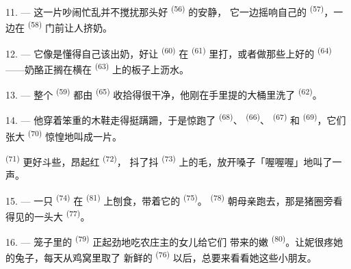 11. --- 这一片吵闹忙乱并不搅扰那头好 \textsuperscript{(56)} 的安静，
它一边摇响自己的 \textsuperscript{(57)}，一边在
\textsuperscript{(58)} 门前让人挤奶。

12. --- 它像是懂得自己该出奶，好让 \textsuperscript{(60)} 在
 \textsuperscript{(61)} 里打，或者做那些上好的
 \textsuperscript{(64)}——奶酪正搁在横在 \textsuperscript{(63)}
上的板子上沥水。

13. --- 整个 \textsuperscript{(59)} 都由 \textsuperscript{(65)}
收拾得很干净，他刚在手里提的大桶里洗了 \textsuperscript{(62)}。

\VUsaut{3.0mm}
\VUsaut{3.0mm}

14. --- 他穿着笨重的木鞋走得挺蹒跚，于是惊跑了 \textsuperscript{(68)}、
 \textsuperscript{(66)}、 \textsuperscript{(67)} 和
\textsuperscript{(69)}，它们张大 \textsuperscript{(70)} 惊惶地叫成一片。

 \textsuperscript{(71)} 更好斗些，昂起红 \textsuperscript{(72)}，
抖了抖 \textsuperscript{(73)} 上的毛，放开嗓子「喔喔喔」地叫了一声。

15. --- 一只 \textsuperscript{(74)} 在
\textsuperscript{(81)} 上刨食，带着它的 \textsuperscript{(75)}。
\textsuperscript{(78)} 朝母亲跑去，那是猪圈旁看得见的一头大
\textsuperscript{(77)}。

16. --- 笼子里的 \textsuperscript{(79)} 正起劲地吃农庄主的女儿给它们
带来的嫩 \textsuperscript{(80)}。让妮很疼她的兔子，每天从鸡窝里取了
新鲜的 \textsuperscript{(76)} 以后，总要来看看她这些小朋友。
\VUsaut{6.0mm}
\VUfilet{22mm}
